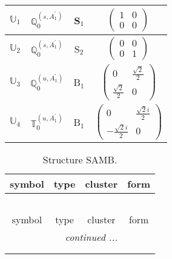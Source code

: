 \documentclass[fleqn,10pt,landscape]{article}
\begin{document}
\begin{itemize}
\begin{center}
\begin{longtable}{c|c|c|c}
$ \mathbb{U}_{1} $ & $\mathbb{Q}_{0}^{(s,A_{1}^{\prime})}$ & S$_{1}$ & $\begin{pmatrix} 1 & 0 \\ 0 & 0 \end{pmatrix}$ \\ \hline
$ \mathbb{U}_{2} $ & $\mathbb{Q}_{0}^{(s,A_{1}^{\prime})}$ & S$_{2}$ & $\begin{pmatrix} 0 & 0 \\ 0 & 1 \end{pmatrix}$ \\ \hline
$ \mathbb{U}_{3} $ & $\mathbb{Q}_{0}^{(u,A_{1}^{\prime})}$ & B$_{1}$ & $\begin{pmatrix} 0 & \frac{\sqrt{2}}{2} \\ \frac{\sqrt{2}}{2} & 0 \end{pmatrix}$ \\
$ \mathbb{U}_{4} $ & $\mathbb{T}_{0}^{(u,A_{1}^{\prime})}$ & B$_{1}$ & $\begin{pmatrix} 0 & \frac{\sqrt{2} i}{2} \\ - \frac{\sqrt{2} i}{2} & 0 \end{pmatrix}$ \\
\end{longtable}
\end{center}
\begin{center}
\renewcommand{\arraystretch}{1.3}
\begin{longtable}{c|c|c|c}
\caption{Structure SAMB.}
 \\
 \hline \hline
symbol & type & cluster & form \\ \hline \endfirsthead

\multicolumn{3}{l}{\tablename\ \thetable{}} \\
 \hline \hline
symbol & type & cluster & form \\ \hline \endhead

 \hline \hline
\multicolumn{3}{r}{\footnotesize\it continued ...} \\ \endfoot

 \hline \hline
\multicolumn{3}{r}{} \\ \endlastfoot


\end{longtable}
\end{center}
\end{itemize}
\end{document}
